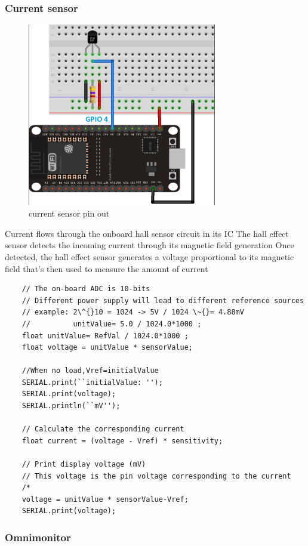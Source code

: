 \subsubsection{Current sensor}

\begin{figure}[!h]
	\centering
	\includegraphics[width=0.7\linewidth, height = 8cm]{Figures/ds18b20}
	\caption{current sensor pin out}
	
\end{figure}
Current flows through the onboard hall sensor circuit in its IC
The hall effect sensor detects the incoming current through its magnetic field generation
Once detected, the hall effect sensor generates a voltage proportional to its magnetic field that’s then used to measure the amount of current 

\begin{lstlisting}
	// The on-board ADC is 10-bits 
	// Different power supply will lead to different reference sources
	// example: 2\^{}10 = 1024 -> 5V / 1024 \~{}= 4.88mV
	//          unitValue= 5.0 / 1024.0*1000 ;
	float unitValue= RefVal / 1024.0*1000 ;
	float voltage = unitValue * sensorValue; 
	
	//When no load,Vref=initialValue
	SERIAL.print(``initialValue: '');
	SERIAL.print(voltage);
	SERIAL.println(``mV''); 
	
	// Calculate the corresponding current
	float current = (voltage - Vref) * sensitivity;
	
	// Print display voltage (mV)
	// This voltage is the pin voltage corresponding to the current
	/*
	voltage = unitValue * sensorValue-Vref;
	SERIAL.print(voltage);
\end{lstlisting} 

\subsubsection{Omnimonitor}

